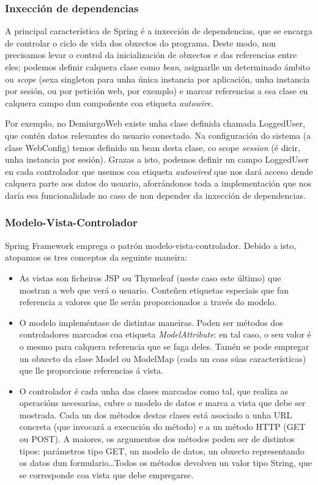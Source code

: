 \subsubsection{Inxección de dependencias}
A principal característica de Spring é a inxección de dependencias, que se
encarga de controlar o ciclo de vida dos obxectos do programa. Deste modo, non
precisamos levar o control da inicialización de obxectos e das referencias entre
eles; podemos definir calquera clase como \textit{bean}, asignarlle un
determinado ámbito ou \textit{scope} (sexa singleton para unha única instancia
por aplicación, unha instancia por sesión, ou por petición web, por exemplo) e
marcar referencias a esa clase en calquera campo dun compoñente coa etiqueta
\textit{autowire}.
\par
Por exemplo, no DemiurgoWeb existe unha clase definida chamada LoggedUser, que
contén datos relevantes do usuario conectado. Na configuración do sistema (a
clase WebConfig) temos definido un bean desta clase, co scope \textit{session}
(é dicir, unha instancia por sesión). Grazas a isto, podemos definir un campo
LoggedUser en cada controlador que usemos coa etiqueta \textit{autowired} que
nos dará acceso dende calquera parte aos datos do usuario, aforrándonos toda a
implementación que nos daría esa funcionalidade no caso de non depender da
inxección de dependencias.

\subsubsection{Modelo-Vista-Controlador}
Spring Framework emprega o patrón modelo-vista-controlador. Debido a isto,
atopamos os tres conceptos da seguinte maneira:
\begin{itemize}
  \item As vistas son ficheiros JSP ou Thymeleaf (neste caso este último) que
  mostran a web que verá o usuario. Conteñen etiquetas especiais que fan
  referencia a valores que lle serán proporcionados a través do modelo.
  \item O modelo impleméntase de distintas maneiras. Poden ser métodos dos
  controladores marcados coa etiqueta \textit{ModelAttribute}: en tal caso, o
  seu valor é o mesmo para calquera referencia que se faga deles. Tamén se pode
  empregar un obxecto da clase Model ou ModelMap (cada un coas súas
  características) que lle proporcione referencias á vista.
  \item O controlador é cada unha das clases marcadas como tal, que realiza as
  operacións necesarias, cubre o modelo de datos e marca a vista que debe ser
  mostrada. Cada un dos métodos destas clases está asociado a unha URL concreta
  (que invocará a execución do método) e a un método HTTP (GET ou POST). A
  maiores, os argumentos dos métodos poden ser de distintos tipos: parámetros
  tipo GET, un modelo de datos, un obxecto representando os datos dun
  formulario\ldots Todos os métodos devolven un valor tipo String, que se
  corresponde coa vista que debe empregarse.
\end{itemize}

